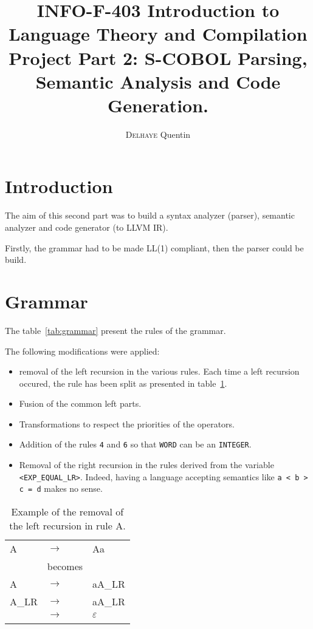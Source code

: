 \documentclass[a4paper,11pt]{article}
\title{INFO-F-403 Introduction to Language Theory and Compilation\\Project Part 2: \textsc{S-COBOL} Parsing, Semantic Analysis and Code Generation.}
\author{\textsc{Delhaye} Quentin}
\newcounter{rule}
\begin{document}
\maketitle

\section{Introduction}
The aim of this second part was to build a syntax analyzer (parser), semantic analyzer and code generator (to LLVM IR).

Firstly, the grammar had to be made LL(1) compliant, then the parser could be build.

\section{Grammar}
The table~\ref{tab:grammar} present the rules of the grammar.

The following modifications were applied:
\begin{itemize}
	\item removal of the left recursion in the various rules.
		Each time a left recursion occured, the rule has been split
		as presented in table~\ref{tab:leftRec}.
	\item Fusion of the common left parts.
	\item Transformations to respect the priorities of the operators.
	\item Addition of the rules \texttt{4} and \texttt{6} so that
		\texttt{WORD} can be an \texttt{INTEGER}.
	\item Removal of the right recursion in the rules derived from
		the variable \texttt{<EXP\_EQUAL\_LR>}. Indeed, having a language
		accepting semantics like \texttt{a < b > c = d} makes no sense.
\end{itemize}

\begin{longtable}{lll}
	A & $\rightarrow$ & Aa \tabularnewline
	  & becomes & \tabularnewline
	A & $\rightarrow$ & aA\_LR \tabularnewline
	A\_LR & $\rightarrow$ & aA\_LR \tabularnewline
	& $\rightarrow$ & $\varepsilon$ \tabularnewline
	\caption{Example of the removal of the left recursion in rule A.}
	\label{tab:leftRec}
\end{longtable}
\end{document}
